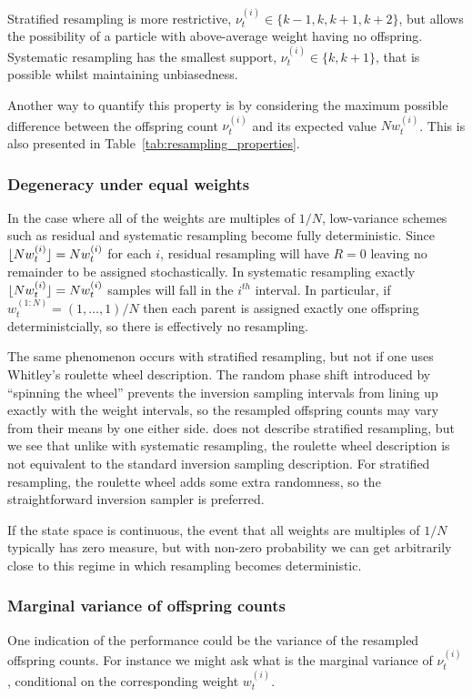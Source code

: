 Stratified resampling is more restrictive, $\nu_t^{(i)} \in \{k-1, k, k+1, k+2\}$, but allows the possibility of a particle with above-average weight having no offspring. 
Systematic resampling has the smallest support, $\nu_t^{(i)} \in \{k, k+1\}$, that is possible whilst maintaining unbiasedness.

Another way to quantify this property is by considering the maximum possible difference between the offspring count $\nu_t^{(i)}$ and its expected value $N w_t^{(i)}$. This is also presented in Table~\ref{tab:resampling_properties}.




\subsubsection{Degeneracy under equal weights \seb{$\checkmark$} }
In the case where all of the weights are multiples of $1/N$, low-variance schemes such as residual and systematic resampling become fully deterministic. 
Since $\lfloor N w_t^{(i)} \rfloor = Nw_t^{(i)}$ for each $i$, residual resampling will have $R=0$ leaving no remainder to be assigned stochastically. 
In systematic resampling exactly $\lfloor N w_t^{(i)} \rfloor = Nw_t^{(i)}$ samples will fall in the $i^{th}$ interval.
In particular, if $w_t^{(1:N)} = (1,\dots, 1)/N$ then each parent is assigned exactly one offspring deterministcially, so there is effectively no resampling.

The same phenomenon occurs with stratified resampling, but not if one uses Whitley's roulette wheel description. The random phase shift introduced by ``spinning the wheel'' prevents the inversion sampling intervals from lining up exactly with the weight intervals, so the resampled offspring counts may vary from their means by one either side.
\textcite{whitley1994} does not describe stratified resampling, but we see that unlike with systematic resampling, the roulette wheel description is not equivalent to the standard inversion sampling description. 
For stratified resampling, the roulette wheel adds some extra randomness, so the straightforward inversion sampler is preferred.

If the state space is continuous, the event that all weights are multiples of $1/N$ typically has zero measure, but with non-zero probability we can get arbitrarily close to this regime in which resampling becomes deterministic.




\subsubsection{Marginal variance of offspring counts \seb{$\checkmark$} }
One indication of the performance could be the variance of the resampled offspring counts. For instance we might ask what is the marginal variance of $\nu_t^{(i)}$, conditional on the corresponding weight $w_t^{(i)}$.


